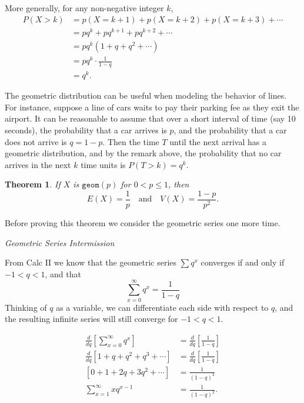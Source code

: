 \documentclass[
]{book}
\newtheorem{theorem}{Theorem}[chapter]
\theoremstyle{definition}
\theoremstyle{definition}
\theoremstyle{definition}
\theoremstyle{definition}
\theoremstyle{remark}
\begin{document}
More generally, for any non-negative integer \(k\),
\begin{align*}
P(X > k) &= p(X=k+1)+p(X=k+2)+p(X=k+3)+\cdots \\
        &= pq^k + pq^{k+1}+pq^{k+2}+\cdots \\
        &= pq^k(1 + q + q^2 + \cdots)\\
        &= pq^k\cdot\frac{1}{1-q}\\
        &= q^k.
\end{align*}

The geometric distribution can be useful when modeling the behavior of lines. For instance, suppose a line of cars waits to pay their parking fee as they exit the airport. It can be reasonable to assume that over a short interval of time (say 10 seconds), the probability that a car arrives is \(p\), and the probability that a car does not arrive is \(q = 1-p.\) Then the time \(T\) until the next arrival has a geometric distribution, and by the remark above, the probability that no car arrives in the next \(k\) time units is \(P(T > k) = q^k\).

\begin{theorem}
\protect\hypertarget{thm:geometric-EandV}{}\label{thm:geometric-EandV}If \(X\) is \(\texttt{geom}(p)\) for \(0 < p \leq 1\), then \[E(X) = \frac{1}{p}~~~\text{ and }~~~  V(X) = \frac{1-p}{p^2}.\]
\end{theorem}

Before proving this theorem we consider the geometric series one more time.

\emph{Geometric Series Intermission}

From Calc II we know that the geometric series \(\sum q^x\) converges if and only if \(-1 < q < 1\), and that \[\sum_{x = 0}^\infty q^x=\frac{1}{1-q} \tag{provided |q|<1}\] Thinking of \(q\) as a variable, we can differentiate each side with respect to \(q\), and the resulting infinite series will still converge for \(-1 < q < 1\).

\begin{align*}
\frac{d}{dq}\left[\sum_{x = 0}^\infty q^x\right] &= \frac{d}{dq}\left[\frac{1}{1-q}\right] \\
\frac{d}{dq}\left[1+q+q^2 + q^3 + \cdots \right] &= \frac{d}{dq}\left[\frac{1}{1-q}\right] \\
\left[0 + 1 + 2q + 3q^2 + \cdots\right] &= \frac{1}{(1-q)^2}\\
\sum_{x = 1}^\infty x q^{x-1} &= \frac{1}{(1-q)^2}.
\end{align*}
\end{document}
